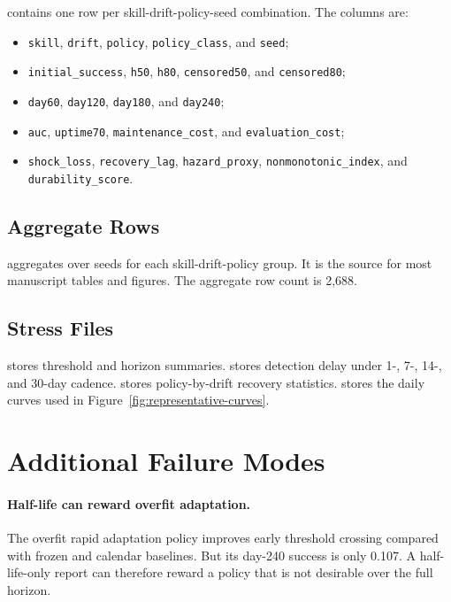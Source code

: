 \documentclass{article}
\begin{document}
 contains one row per
skill-drift-policy-seed combination. The columns are:
\begin{itemize}
    \item \texttt{skill}, \texttt{drift}, \texttt{policy}, \texttt{policy\_class}, and \texttt{seed};
    \item \texttt{initial\_success}, \texttt{h50}, \texttt{h80}, \texttt{censored50}, and \texttt{censored80};
    \item \texttt{day60}, \texttt{day120}, \texttt{day180}, and \texttt{day240};
    \item \texttt{auc}, \texttt{uptime70}, \texttt{maintenance\_cost}, and \texttt{evaluation\_cost};
    \item \texttt{shock\_loss}, \texttt{recovery\_lag}, \texttt{hazard\_proxy},
    \texttt{nonmonotonic\_index}, and \texttt{durability\_score}.
\end{itemize}

\subsection{Aggregate Rows}

 aggregates over seeds for
each skill-drift-policy group. It is the source for most manuscript tables and
figures. The aggregate row count is 2,688.

\subsection{Stress Files}

 stores threshold and horizon summaries.
 stores detection delay under 1-, 7-, 14-, and
30-day cadence.  stores policy-by-drift recovery
statistics.  stores the daily curves used in
Figure~\ref{fig:representative-curves}.

\section{Additional Failure Modes}

\paragraph{Half-life can reward overfit adaptation.}
The overfit rapid adaptation policy improves early threshold crossing compared
with frozen and calendar baselines. But its day-240 success is only 0.107. A
half-life-only report can therefore reward a policy that is not desirable over
the full horizon.
\end{document}
